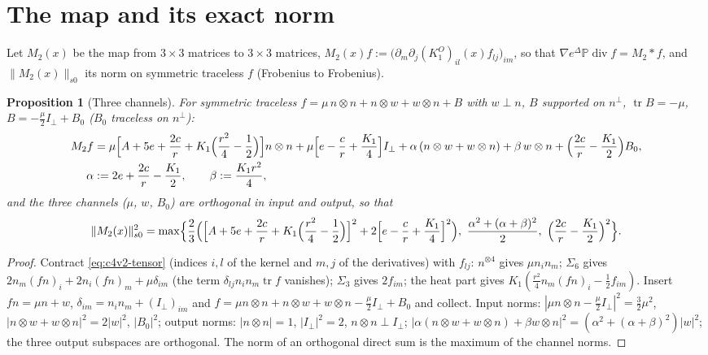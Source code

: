 \documentclass[11pt]{article}
\newcommand{\PP}{\mathbb P}
\theoremstyle{plain}
\newtheorem{proposition}[theorem]{Proposition}
\theoremstyle{definition}
\theoremstyle{remark}
\begin{document}
\section{The map and its exact norm}
\label{sec:c4v2-norm}

Let \(M_2(x)\) be the map from \(3\times3\) matrices to \(3\times3\) matrices,
\(M_2(x)f:=\bigl(\partial_m\partial_j(K^O_1)_{il}(x)f_{lj}\bigr)_{im}\), so that \(\nabla e^{\Delta}\PP\operatorname{div}f=M_2*f\),
and \(\|M_2(x)\|_{s0}\) its norm on symmetric traceless \(f\) (Frobenius to
Frobenius).

\begin{proposition}[Three channels]
\label{prop:c4v2-channels}
For symmetric traceless \(f=\mu\,n\otimes n+n\otimes w+w\otimes n+B\) with \(w\perp n\), \(B\) supported
on \(n^\perp\), \(\operatorname{tr}B=-\mu\), \(B=-\frac\mu2I_\perp+B_0\) (\(B_0\) traceless on \(n^\perp\)):
\begin{align}
 M_2f&=\mu\Bigl[A+5e+\frac{2c}r+K_1\Bigl(\frac{r^2}4-\frac12\Bigr)\Bigr]n\otimes n+\mu\Bigl[e-\frac cr+\frac{K_1}4\Bigr]I_\perp
 +\alpha\,(n\otimes w+w\otimes n)+\beta\,w\otimes n+\Bigl(\frac{2c}r-\frac{K_1}2\Bigr)B_0,
 \label{eq:c4v2-map}\\
 \alpha&:=2e+\frac{2c}r-\frac{K_1}2,\qquad \beta:=\frac{K_1r^2}4 ,\notag
\end{align}
and the three channels (\(\mu\), \(w\), \(B_0\)) are orthogonal in input and
output, so that
\begin{equation}
 \|M_2(x)\|_{s0}^2=\max\Bigl\{\frac23\Bigl(\Bigl[A+5e+\frac{2c}r+K_1\Bigl(\frac{r^2}4-\frac12\Bigr)\Bigr]^2+2\Bigl[e-\frac cr+\frac{K_1}4\Bigr]^2\Bigr),\
 \frac{\alpha^2+(\alpha+\beta)^2}2,\ \Bigl(\frac{2c}r-\frac{K_1}2\Bigr)^2\Bigr\}.
 \label{eq:c4v2-opnorm}
\end{equation}
\end{proposition}

\begin{proof}
Contract \eqref{eq:c4v2-tensor} (indices \(i,l\) of the kernel and \(m,j\) of
the derivatives) with \(f_{lj}\): \(n^{\otimes4}\) gives \(\mu n_in_m\); \(\Sigma_6\) gives
\(2n_m(fn)_i+2n_i(fn)_m+\mu\delta_{im}\) (the term \(\delta_{lj}n_in_m\operatorname{tr}f\) vanishes); \(\Sigma_3\)
gives \(2f_{im}\); the heat part gives \(K_1(\frac{r^2}4n_m(fn)_i-\frac12f_{im})\).  Insert
\(fn=\mu n+w\), \(\delta_{im}=n_in_m+(I_\perp)_{im}\) and \(f=\mu n\otimes n+n\otimes w+w\otimes n-\frac\mu2I_\perp+B_0\) and
collect.  Input norms: \(|\mu n\otimes n-\frac\mu2I_\perp|^2=\frac32\mu^2\), \(|n\otimes w+w\otimes n|^2=2|w|^2\),
\(|B_0|^2\); output norms: \(|n\otimes n|=1\), \(|I_\perp|^2=2\), \(n\otimes n\perp I_\perp\);
\(|\alpha(n\otimes w+w\otimes n)+\beta w\otimes n|^2=(\alpha^2+(\alpha+\beta)^2)|w|^2\); the three output
subspaces are orthogonal.  The norm of an orthogonal direct sum is
the maximum of the channel norms.
\end{proof}
\end{document}
